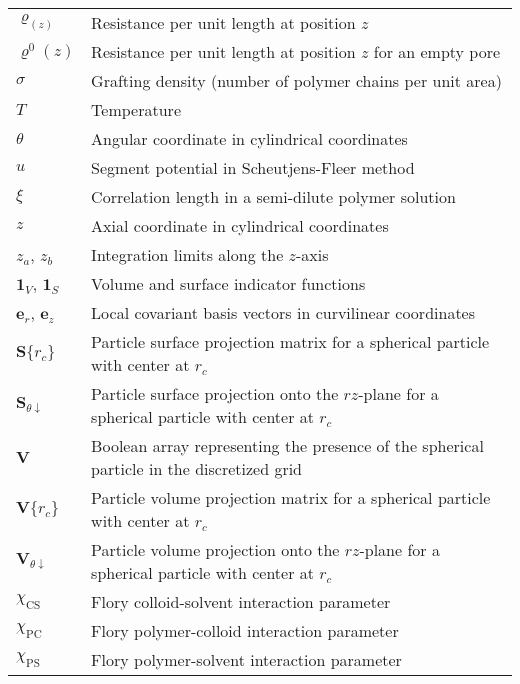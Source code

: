 \documentclass[10pt, a4paper, twocolumn]{article}
\begin{document}
\begin{tabularx}{\linewidth}{l X}
    $\varrho_(z)$ & Resistance per unit length at position $z$ \\
    $\varrho^{0}(z)$ & Resistance per unit length at position $z$ for an empty pore \\
    $\sigma$ & Grafting density (number of polymer chains per unit area) \\
    $T$ & Temperature \\
    $\theta$ & Angular coordinate in cylindrical coordinates \\
    $u$ & Segment potential in Scheutjens-Fleer method\\
    $\xi$ & Correlation length in a semi-dilute polymer solution \\
    $z$ & Axial coordinate in cylindrical coordinates \\
    $z_a$, $z_b$ & Integration limits along the $z$-axis \\
    $\bm{1}_{V}$, $\bm{1}_{S}$ & Volume and surface indicator functions \\
    $\bm{e}_r$, $\bm{e}_z$ & Local covariant basis vectors in curvilinear coordinates \\
    $\bm{S}\{r_{c}\}$ & Particle surface projection matrix for a spherical particle with center at $r_{c}$ \\
    $\bm{S}_{\theta\downarrow}$ & Particle surface projection onto the $rz$-plane for a spherical particle with center at $r_{c}$ \\
    $\bm{V}$ & Boolean array representing the presence of the spherical particle in the discretized grid \\
    $\bm{V}\{r_{c}\}$ & Particle volume projection matrix for a spherical particle with center at $r_{c}$ \\
    $\bm{V}_{\theta\downarrow}$ & Particle volume projection onto the $rz$-plane for a spherical particle with center at $r_{c}$ \\
    $\chi_{\text{CS}}$ & Flory colloid-solvent interaction parameter \\
    $\chi_{\text{PC}}$ & Flory polymer-colloid interaction parameter \\
    $\chi_{\textrm{PS}}$ & Flory polymer-solvent interaction parameter \\
\end{tabularx}
%

\printbibliography
\end{document}
